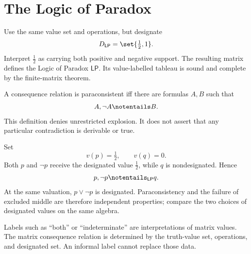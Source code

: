 \section{The Logic of Paradox}
\label{sec:many-valued-paraconsistent-04}

Use the same value set and operations, but designate
\[
  D_{\mathsf{LP}}=\set{\tfrac12,1}.
\]
Interpret \(\tfrac12\) as carrying both positive and negative support.  The
resulting matrix defines the Logic of Paradox \(\mathsf{LP}\).  Its
value-labelled tableau is sound and complete by the finite-matrix theorem.

\begin{definition}
A consequence relation is paraconsistent iff there are formulas
\(A,B\) such that
\[
  A,\neg A\notentails B.
\]
This definition denies unrestricted explosion.  It does not assert that any
particular contradiction is derivable or true.
\end{definition}

\begin{example}
Set
\[
  v(p)=\tfrac12,
  \qquad
  v(q)=0.
\]
Both \(p\) and \(\neg p\) receive the designated value \(\tfrac12\), while
\(q\) is nondesignated.  Hence
\[
  p,\neg p\notentails_{\mathsf{LP}}q.
\]
At the same valuation, \(p\lor\neg p\) is designated.  Paraconsistency and the
failure of excluded middle are therefore independent properties; compare the
two choices of designated values on the same algebra.
\end{example}

\begin{warning}
Labels such as ``both'' or ``indeterminate'' are interpretations of matrix
values.  The matrix consequence relation is determined by the truth-value set,
operations, and designated set.  An informal label cannot replace those data.
\end{warning}

